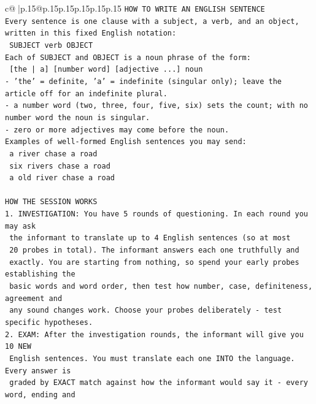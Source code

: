 \documentclass{article}
\begin{document}
{\begin{supertabular}{c@{$\;$}|p{.15\linewidth}@{}p{.15\linewidth}p{.15\linewidth}p{.15\linewidth}p{.15\linewidth}p{.15\linewidth}}
{{{\texttt{HOW TO WRITE AN ENGLISH SENTENCE} \\
\texttt{Every sentence is one clause with a subject, a verb, and an object, written in this fixed English notation:} \\
\texttt{    SUBJECT  verb  OBJECT} \\
\texttt{Each of SUBJECT and OBJECT is a noun phrase of the form:} \\
\texttt{    {[}the | a{]}  {[}number word{]}  {[}adjective ...{]}  noun} \\
\texttt{{-} 'the' = definite, 'a' = indefinite (singular only); leave the article off for an indefinite plural.} \\
\texttt{{-} a number word (two, three, four, five, six) sets the count; with no number word the noun is singular.} \\
\texttt{{-} zero or more adjectives may come before the noun.} \\
\texttt{Examples of well{-}formed English sentences you may send:} \\
\texttt{    a river chase a road} \\
\texttt{    six rivers chase a road} \\
\texttt{    a old river chase a road} \\
\\ 
\texttt{HOW THE SESSION WORKS} \\
\texttt{1. INVESTIGATION: You have 5 rounds of questioning. In each round you may ask} \\
\texttt{   the informant to translate up to 4 English sentences (so at most} \\
\texttt{   20 probes in total). The informant answers each one truthfully and} \\
\texttt{   exactly. You are starting from nothing, so spend your early probes establishing the} \\
\texttt{   basic words and word order, then test how number, case, definiteness, agreement and} \\
\texttt{   any sound changes work. Choose your probes deliberately {-} test specific hypotheses.} \\
\texttt{2. EXAM: After the investigation rounds, the informant will give you 10 NEW} \\
\texttt{   English sentences. You must translate each one INTO the language. Every answer is} \\
\texttt{   graded by EXACT match against how the informant would say it {-} every word, ending and} \\
}}}
\end{supertabular}}
\end{document}

